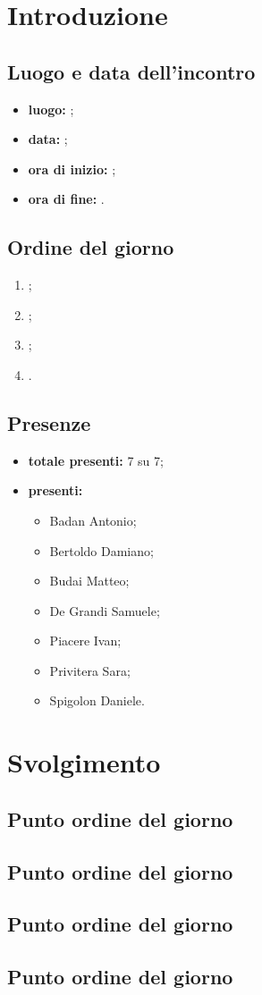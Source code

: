 \section*{Introduzione}
\subsection*{Luogo e data dell'incontro}
\begin{itemize}
	\item \textbf{luogo:} ;
	\item \textbf{data:} ;
	\item \textbf{ora di inizio:} ;
	\item \textbf{ora di fine:} .
\end{itemize}

\subsection*{Ordine del giorno}
\begin{enumerate}
	\item ;
	\item ;
	\item ;
	\item .
\end{enumerate}

\subsection*{Presenze}
\begin{itemize}
	\item \textbf{totale presenti:} 7 su 7;
	\item \textbf{presenti:}
	\begin{itemize}
		\item Badan Antonio;
		\item Bertoldo Damiano;
		\item Budai Matteo;
		\item De Grandi Samuele;
		\item Piacere Ivan;
		\item Privitera Sara;
		\item Spigolon Daniele.
	\end{itemize}
\end{itemize}

\section*{Svolgimento}
\subsection*{Punto ordine del giorno}
\subsection*{Punto ordine del giorno}
\subsection*{Punto ordine del giorno}
\subsection*{Punto ordine del giorno}
